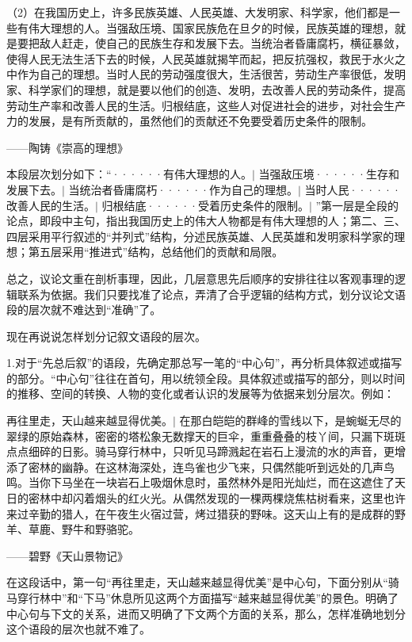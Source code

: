 （2）在我国历史上，许多民族英雄、人民英雄、大发明家、科学家，他们都是一些有伟大理想的人。当强敌压境、国家民族危在旦夕的时候，民族英雄的理想，就是要把敌人赶走，使自己的民族生存和发展下去。当统治者昏庸腐朽，横征暴敛，使得人民无法生活下去的时候，人民英雄就揭竿而起，把反抗强权，救民于水火之中作为自己的理想。当时人民的劳动强度很大，生活很苦，劳动生产率很低，发明家、科学家们的理想，就是要以他们的创造、发明，去改善人民的劳动条件，提高劳动生产率和改善人民的生活。归根结底，这些人对促进社会的进步，对社会生产力的发展，是有所贡献的，虽然他们的贡献还不免要受着历史条件的限制。
\begin{flushright}
——陶铸《崇高的理想》
\end{flushright}

本段层次划分如下：“······有伟大理想的人。$\vert$ 当强敌压境······生存和发展下去。$\vert$ 当统治者昏庸腐朽······作为自己的理想。$\vert$ 当时人民······改善人民的生活。$\vert$ 归根结底······受着历史条件的限制。$\vert$  ”第一层是全段的论点，即段中主句，指出我国历史上的伟大人物都是有伟大理想的人；第二、三、四层采用平行叙述的“并列式”结构，分述民族英雄、人民英雄和发明家科学家的理想；第五层采用“推进式”结构，总结他们的贡献和局限。

总之，议论文重在剖析事理，因此，几层意思先后顺序的安排往往以客观事理的逻辑联系为依据。我们只要找准了论点，弄清了合乎逻辑的结构方式，划分议论文语段的层次就不难达到“准确”了。

现在再说说怎样划分记叙文语段的层次。

1.对于“先总后叙”的语段，先确定那总写一笔的“中心句”，再分析具体叙述或描写的部分。“中心句”往往在首句，用以统领全段。具体叙述或描写的部分，则以时间的推移、空间的转换、人物的变化或者认识的发展等为依据来划分层次。例如：

再往里走，天山越来越显得优美。$\vert$ 在那白皑皑的群峰的雪线以下，是蜿蜒无尽的翠绿的原始森林，密密的塔松象无数撑天的巨伞，重重叠叠的枝丫间，只漏下斑斑点点细碎的日影。骑马穿行林中，只听见马蹄溅起在岩石上漫流的水的声音，更增添了密林的幽静。在这林海深处，连鸟雀也少飞来，只偶然能听到远处的几声鸟鸣。当你下马坐在一块岩石上吸烟休息时，虽然林外是阳光灿烂，而在这遮住了天日的密林中却闪着烟头的红火光。从偶然发现的一棵两棵烧焦枯树看来，这里也许来过辛勤的猎人，在午夜生火宿过营，烤过猎获的野味。这天山上有的是成群的野羊、草鹿、野牛和野骆驼。
\begin{flushright}
——碧野《天山景物记》
\end{flushright}

在这段话中，第一句“再往里走，天山越来越显得优美”是中心句，下面分别从“骑马穿行林中”和“下马”休息所见这两个方面描写“越来越显得优美”的景色。明确了中心句与下文的关系，进而又明确了下文两个方面的关系，那么，怎样准确地划分这个语段的层次也就不难了。


